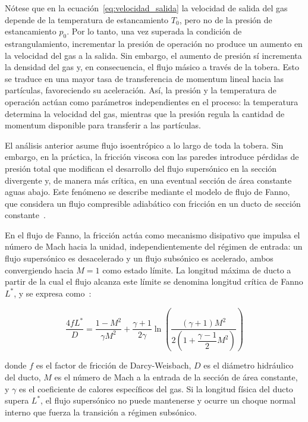 Nótese que en la ecuación~\ref{eq:velocidad_salida} la velocidad de salida del gas depende de la temperatura de estancamiento \( T_0 \), pero no de la presión de estancamiento \( p_0 \). Por lo tanto, una vez superada la condición de estrangulamiento, incrementar la presión de operación no produce un aumento en la velocidad del gas a la salida. Sin embargo, el aumento de presión sí incrementa la densidad del gas y, en consecuencia, el flujo másico a través de la tobera. Esto se traduce en una mayor tasa de transferencia de momentum lineal hacia las partículas, favoreciendo su aceleración. Así, la presión y la temperatura de operación actúan como parámetros independientes en el proceso: la temperatura determina la velocidad del gas, mientras que la presión regula la cantidad de momentum disponible para transferir a las partículas.

El análisis anterior asume flujo isoentrópico a lo largo de toda la tobera. 
Sin embargo, en la práctica, la fricción viscosa con las paredes introduce 
pérdidas de presión total que modifican el desarrollo del flujo supersónico 
en la sección divergente y, de manera más crítica, en una eventual sección 
de área constante aguas abajo. Este fenómeno se describe mediante 
el modelo de flujo de Fanno, que considera un flujo compresible adiabático 
con fricción en un ducto de sección constante~\cite{Anderson2021}.

En el flujo de Fanno, la fricción actúa como mecanismo disipativo que 
impulsa el número de Mach hacia la unidad, independientemente del régimen 
de entrada: un flujo supersónico es desacelerado y un flujo subsónico es 
acelerado, ambos convergiendo hacia $M = 1$ como estado límite. La longitud 
máxima de ducto a partir de la cual el flujo alcanza este límite se denomina 
longitud crítica de Fanno $L^*$, y se expresa como~\cite{Anderson2021}:

\begin{equation}
	\frac{4fL^*}{D} = \frac{1-M^2}{\gamma M^2} + 
	\frac{\gamma+1}{2\gamma}\ln\left(\frac{(\gamma+1)M^2}
	{2\left(1+\dfrac{\gamma-1}{2}M^2\right)}\right)
	\label{eq:fanno}
\end{equation}

donde $f$ es el factor de fricción de Darcy-Weisbach, $D$ es el diámetro 
hidráulico del ducto, $M$ es el número de Mach a la entrada de la sección 
de área constante, y $\gamma$ es el coeficiente de calores específicos del 
gas. Si la longitud física del ducto supera $L^*$, el flujo supersónico no 
puede mantenerse y ocurre un choque normal interno que fuerza la transición 
a régimen subsónico. 
